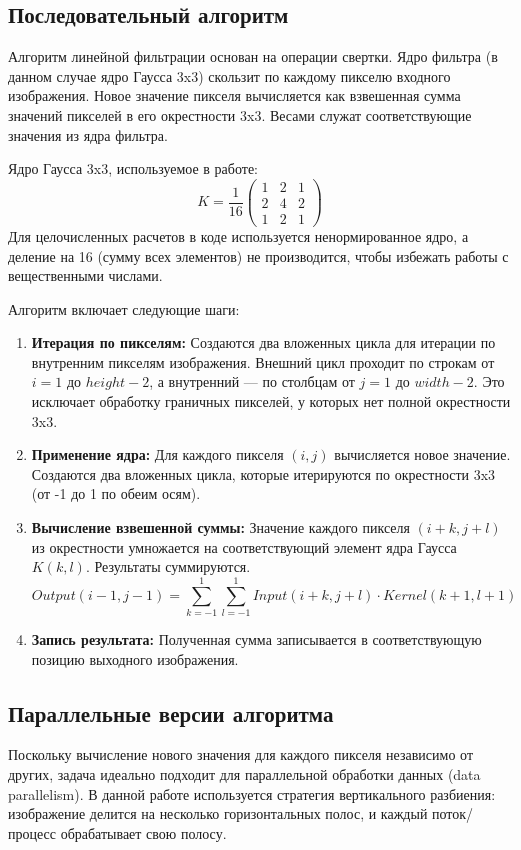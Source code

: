 \documentclass[12pt,a4paper]{extarticle}
\begin{document}
\subsection{Последовательный алгоритм}
Алгоритм линейной фильтрации основан на операции свертки. Ядро фильтра (в данном случае ядро Гаусса 3x3) скользит по каждому пикселю входного изображения. Новое значение пикселя вычисляется как взвешенная сумма значений пикселей в его окрестности 3x3. Весами служат соответствующие значения из ядра фильтра.

Ядро Гаусса 3x3, используемое в работе:
\[
K = \frac{1}{16} \begin{pmatrix} 1 & 2 & 1 \\ 2 & 4 & 2 \\ 1 & 2 & 1 \end{pmatrix}
\]
Для целочисленных расчетов в коде используется ненормированное ядро, а деление на 16 (сумму всех элементов) не производится, чтобы избежать работы с вещественными числами.

Алгоритм включает следующие шаги:
\begin{enumerate}
    \item \textbf{Итерация по пикселям:} Создаются два вложенных цикла для итерации по внутренним пикселям изображения. Внешний цикл проходит по строкам от \(i=1\) до \(height-2\), а внутренний — по столбцам от \(j=1\) до \(width-2\). Это исключает обработку граничных пикселей, у которых нет полной окрестности 3x3.
    \item \textbf{Применение ядра:} Для каждого пикселя \((i, j)\) вычисляется новое значение. Создаются два вложенных цикла, которые итерируются по окрестности 3x3 (от -1 до 1 по обеим осям).
    \item \textbf{Вычисление взвешенной суммы:} Значение каждого пикселя \((i+k, j+l)\) из окрестности умножается на соответствующий элемент ядра Гаусса \(K(k, l)\). Результаты суммируются.
    \[
    Output(i-1, j-1) = \sum_{k=-1}^{1} \sum_{l=-1}^{1} Input(i+k, j+l) \cdot Kernel(k+1, l+1)
    \]
    \item \textbf{Запись результата:} Полученная сумма записывается в соответствующую позицию выходного изображения.
\end{enumerate}

\subsection{Параллельные версии алгоритма}
Поскольку вычисление нового значения для каждого пикселя независимо от других, задача идеально подходит для параллельной обработки данных (data parallelism). В данной работе используется стратегия вертикального разбиения: изображение делится на несколько горизонтальных полос, и каждый поток/процесс обрабатывает свою полосу.
\end{document}
